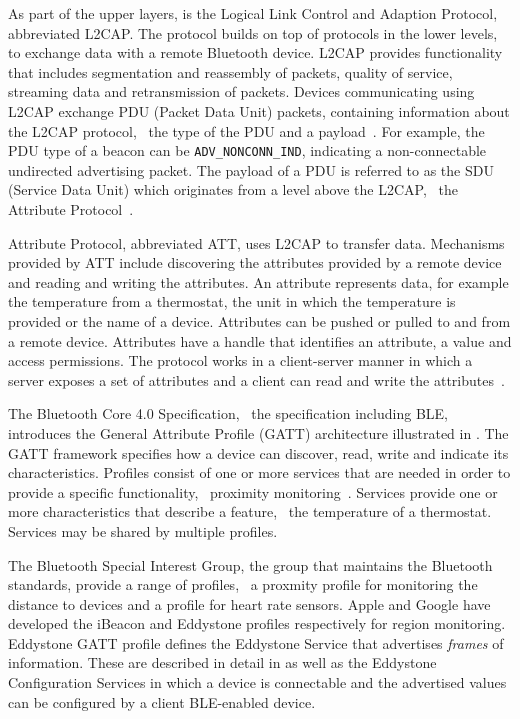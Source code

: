 As part of the upper layers, is the Logical Link Control and Adaption Protocol, abbreviated L2CAP. The protocol builds on top of protocols in the lower levels, to exchange data with a remote Bluetooth device. L2CAP provides functionality that includes segmentation and reassembly of packets, quality of service, streaming data and retransmission of packets. Devices communicating using L2CAP exchange PDU (Packet Data Unit) packets, containing information about the L2CAP protocol, \eg~the type of the PDU and a payload~\cite[pp. 80-83]{gupta2013inside}. For example, the PDU type of a beacon can be \texttt{ADV\_NONCONN\_IND}, indicating a non-connectable undirected advertising packet. The payload of a PDU is referred to as the SDU (Service Data Unit) which originates from a level above the L2CAP, \eg~the Attribute Protocol~\cite[p. 201]{gupta2013inside}.

Attribute Protocol, abbreviated ATT, uses L2CAP to transfer data. Mechanisms provided by ATT include discovering the attributes provided by a remote device and reading and writing the attributes. An attribute represents data, for example the temperature from a thermostat, the unit in which the temperature is provided or the name of a device. Attributes can be pushed or pulled to and from a remote device. Attributes have a handle that identifies an attribute, a value and access permissions. The protocol works in a client-server manner in which a server exposes a set of attributes and a client can read and write the attributes~\cite{gupta2013inside}.

The Bluetooth Core 4.0 Specification, \ie~the specification including BLE, introduces the General Attribute Profile (GATT) architecture illustrated in . The GATT framework specifies how a device can discover, read, write and indicate its characteristics. Profiles consist of one or more services that are needed in order to provide a specific functionality, \eg~proximity monitoring~\cite[p. 259-261]{gupta2013inside}. Services provide one or more characteristics that describe a feature, \eg~the temperature of a thermostat. Services may be shared by multiple profiles.

The Bluetooth Special Interest Group, the group that maintains the Bluetooth standards, provide a range of profiles, \eg~a proxmity profile for monitoring the distance to devices and a profile for heart rate sensors.
Apple and Google have developed the iBeacon and Eddystone profiles respectively for region monitoring.
Eddystone GATT profile defines the Eddystone Service that advertises \emph{frames} of information. These are described in detail in  as well as the Eddystone Configuration Services in which a device is connectable and the advertised values can be configured by a client BLE-enabled device.

